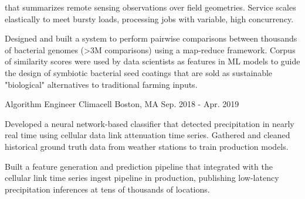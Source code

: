 \begin{cventries}
{\begin{cvitems}
{            that summarizes remote sensing observations over field
            geometries. Service scales elastically to meet bursty
            loads, processing jobs with variable, high concurrency.
        }
        \item {
            Designed and built a system to perform pairwise comparisons
            between thousands of bacterial genomes (>3M comparisons)
            using a map-reduce framework. Corpus of similarity 
            scores were used by data scientists as features in ML 
            models to guide the design of symbiotic bacterial seed 
            coatings that are sold as sustainable "biological" 
            alternatives to traditional farming inputs.
        }
      \end{cvitems}
    }

  \cventry
    {Algorithm Engineer} %
    {Climacell} %
    {Boston, MA} %
    {Sep. 2018 - Apr. 2019} %
    {
      \begin{cvitems} %
        \item {
            Developed a neural network-based classifier that detected
            precipitation in nearly real time using cellular data link attenuation
            time series. Gathered and cleaned historical ground truth 
            data from weather stations to train production models.
        }
        \item {
            Built a feature generation and prediction pipeline that integrated
            with the cellular link time series ingest pipeline in production,
            publishing low-latency precipitation inferences at tens of thousands
            of locations.
        }
      \end{cvitems}
    }


\end{cventries}
